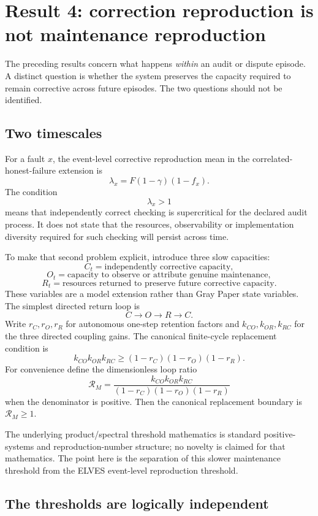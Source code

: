 \section{Result 4: correction reproduction is not maintenance reproduction}
\label{sec:recurrent-maintenance}

The preceding results concern what happens \emph{within} an audit or dispute episode. A distinct question is whether the system preserves the capacity required to remain corrective across future episodes. The two questions should not be identified.

\subsection{Two timescales}

For a fault $x$, the event-level corrective reproduction mean in the correlated-honest-failure extension is
\[
\lambda_x=F(1-\gamma)(1-f_x).
\]
The condition
\[
\lambda_x>1
\]
means that independently correct checking is supercritical for the declared audit process. It does not state that the resources, observability or implementation diversity required for such checking will persist across time.

To make that second problem explicit, introduce three slow capacities:
\[
C_t=\text{independently corrective capacity},
\]
\[
O_t=\text{capacity to observe or attribute genuine maintenance},
\]
\[
R_t=\text{resources returned to preserve future corrective capacity}.
\]
These variables are a model extension rather than Gray Paper state variables. The simplest directed return loop is
\[
C\longrightarrow O\longrightarrow R\longrightarrow C.
\]
Write $r_C,r_O,r_R$ for autonomous one-step retention factors and $k_{CO},k_{OR},k_{RC}$ for the three directed coupling gains. The canonical finite-cycle replacement condition is
\[
\boxed{
 k_{CO}k_{OR}k_{RC}
 \ge
 (1-r_C)(1-r_O)(1-r_R).
}
\]
For convenience define the dimensionless loop ratio
\[
\mathcal R_M
=
\frac{k_{CO}k_{OR}k_{RC}}
{(1-r_C)(1-r_O)(1-r_R)}
\]
when the denominator is positive. Then the canonical replacement boundary is $\mathcal R_M\ge1$.

The underlying product/spectral threshold mathematics is standard positive-systems and reproduction-number structure; no novelty is claimed for that mathematics. The point here is the separation of this slower maintenance threshold from the ELVES event-level reproduction threshold.

\subsection{The thresholds are logically independent}

